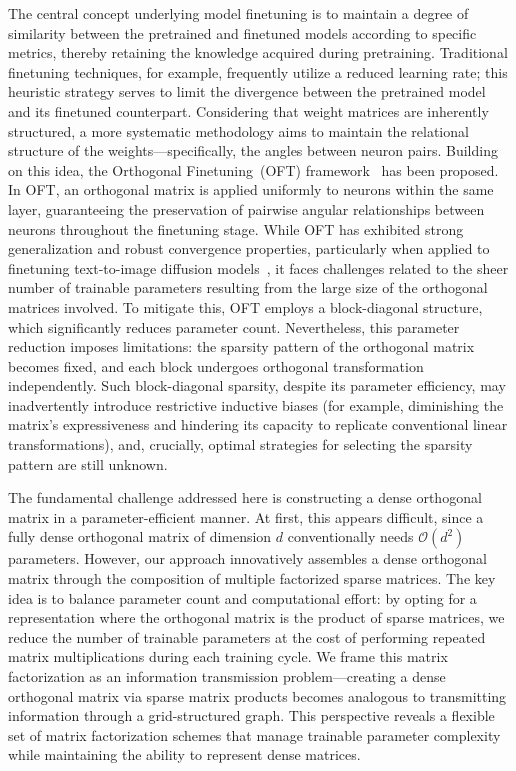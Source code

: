 The central concept underlying model finetuning is to maintain a degree of similarity between the pretrained and finetuned models according to specific metrics, thereby retaining the knowledge acquired during pretraining. Traditional finetuning techniques, for example, frequently utilize a reduced learning rate; this heuristic strategy serves to limit the divergence between the pretrained model and its finetuned counterpart. Considering that weight matrices are inherently structured, a more systematic methodology aims to maintain the relational structure of the weights—specifically, the angles between neuron pairs. Building on this idea, the Orthogonal Finetuning~(OFT) framework~\cite{qiu2023controlling} has been proposed. In OFT, an orthogonal matrix is applied uniformly to neurons within the same layer, guaranteeing the preservation of pairwise angular relationships between neurons throughout the finetuning stage. While OFT has exhibited strong generalization and robust convergence properties, particularly when applied to finetuning text-to-image diffusion models~\cite{qiu2023controlling}, it faces challenges related to the sheer number of trainable parameters resulting from the large size of the orthogonal matrices involved. To mitigate this, OFT employs a block-diagonal structure, which significantly reduces parameter count. Nevertheless, this parameter reduction imposes limitations: the sparsity pattern of the orthogonal matrix becomes fixed, and each block undergoes orthogonal transformation independently. Such block-diagonal sparsity, despite its parameter efficiency, may inadvertently introduce restrictive inductive biases (for example, diminishing the matrix's expressiveness and hindering its capacity to replicate conventional linear transformations), and, crucially, optimal strategies for selecting the sparsity pattern are still unknown.

The fundamental challenge addressed here is constructing a dense orthogonal matrix in a parameter-efficient manner. At first, this appears difficult, since a fully dense orthogonal matrix of dimension $d$ conventionally needs $\mathcal{O}(d^2)$ parameters. However, our approach innovatively assembles a dense orthogonal matrix through the composition of multiple factorized sparse matrices. The key idea is to balance parameter count and computational effort: by opting for a representation where the orthogonal matrix is the product of sparse matrices, we reduce the number of trainable parameters at the cost of performing repeated matrix multiplications during each training cycle. We frame this matrix factorization as an information transmission problem—creating a dense orthogonal matrix via sparse matrix products becomes analogous to transmitting information through a grid-structured graph. This perspective reveals a flexible set of matrix factorization schemes that manage trainable parameter complexity while maintaining the ability to represent dense matrices.

